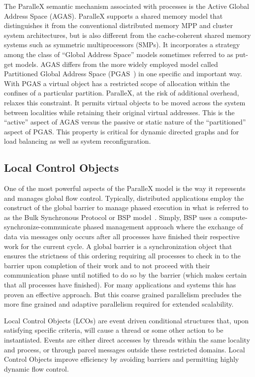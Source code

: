 \documentclass[floatfix]{revtex4}
\begin{document}
The ParalleX semantic mechanism associated with processes is the Active Global Address Space (AGAS).
ParalleX supports a shared memory model that distinguishes it from the
conventional distributed memory MPP and cluster system architectures,
but is also different from the cache-coherent shared memory systems such
as symmetric multiprocessors (SMPs). It incorporates a strategy among the class of ``Global Address
Space'' models sometimes referred to as put-get models. AGAS differs
from the more widely employed model called Partitioned Global Address Space (PGAS~\cite{gasnet,UPCSpec,Charles:2005:XOA:1103845.1094852})
in one specific and important way. With PGAS a virtual object has a restricted scope of
allocation within the confines of a particular partition.
ParalleX, at the risk of additional overhead, relaxes this constraint. It
permits virtual objects to be moved across the system between localities
while retaining their original virtual addresses. This is the ``active'' aspect
of AGAS versus the passive or static nature of the ``partitioned''
aspect of PGAS. This property is critical for dynamic directed graphs and for
load balancing as well as system reconfiguration.

\subsection{Local Control Objects}
\label{subsec:lcos}
One of the most powerful aspects of the ParalleX model is the way it
represents and manages global flow control. Typically, distributed
applications employ the construct of the global barrier to manage phased
execution in what is referred to as the Bulk Synchronous Protocol or
BSP model~\cite{bsp}. Simply, BSP uses a compute-synchronize-communicate
phased management approach where the exchange of data via messages only
occurs after all processes have finished their respective work for the
current cycle. A global barrier is a synchronization object that ensures
the strictness of this ordering requiring all processes to check in to the
barrier upon completion of their work and to not proceed with their
communication phase until notified to do so by the barrier
(which makes certain that all processes have finished). For many
applications and systems this has proven an effective approach. But
this coarse grained parallelism precludes the more fine grained and
adaptive parallelism required for extended scalability.

Local Control Objects (LCOs) are event driven conditional structures
that, upon satisfying specific criteria, will cause a thread or some other
action to be
instantiated. Events are either direct accesses by threads within the
same locality and process, or through parcel messages outside these
restricted domains. Local Control Objects improve efficiency by avoiding
barriers and permitting highly dynamic flow control.
\end{document}
